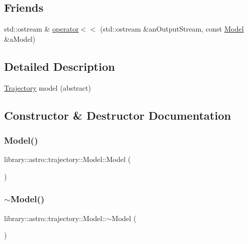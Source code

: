 \subsection*{Friends}
\begin{DoxyCompactItemize}
\item 
std\+::ostream \& \hyperlink{classlibrary_1_1astro_1_1trajectory_1_1_model_a68240493d08f91f6613186eb52823e85}{operator$<$$<$} (std\+::ostream \&an\+Output\+Stream, const \hyperlink{classlibrary_1_1astro_1_1trajectory_1_1_model}{Model} \&a\+Model)
\end{DoxyCompactItemize}


\subsection{Detailed Description}
\hyperlink{classlibrary_1_1astro_1_1_trajectory}{Trajectory} model (abstract) 

\subsection{Constructor \& Destructor Documentation}
\mbox{\label{classlibrary_1_1astro_1_1trajectory_1_1_model_a083bde3f2c8d3d1406220ad3e2dd9cd9}} 
\subsubsection{\texorpdfstring{Model()}{Model()}}
{\footnotesize\ttfamily library\+::astro\+::trajectory\+::\+Model\+::\+Model (\begin{DoxyParamCaption}{ }\end{DoxyParamCaption})}

\mbox{\label{classlibrary_1_1astro_1_1trajectory_1_1_model_abd305caa6adde24bf7ee2eb93e0639d1}} 
\subsubsection{\texorpdfstring{$\sim$\+Model()}{~Model()}}
{\footnotesize\ttfamily library\+::astro\+::trajectory\+::\+Model\+::$\sim$\+Model (\begin{DoxyParamCaption}{ }\end{DoxyParamCaption})\hspace{0.3cm}{\ttfamily [pure virtual]}}



